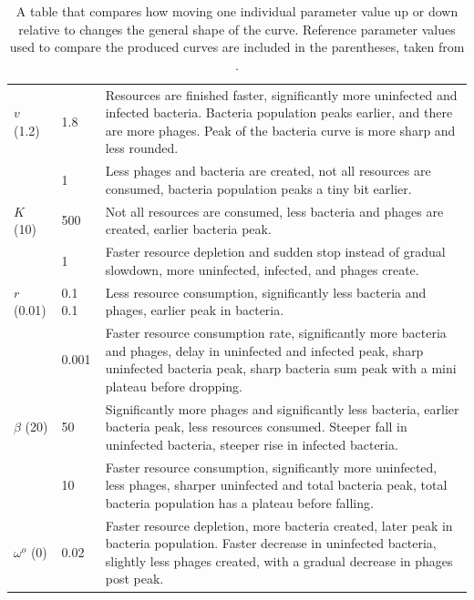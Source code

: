 \begin{table}
\begin{tabularx}{\textwidth}{l l X}
        \midrule
        $v$ (1.2) & 1.8 & Resources are finished faster, significantly more uninfected and infected bacteria. Bacteria population peaks earlier, and there are more phages. Peak of the bacteria curve is more sharp and less rounded. \\
         & 1 & Less phages and bacteria are created, not all resources are consumed, bacteria population peaks a tiny bit earlier.\\

        \midrule
        $K$ (10) & 500 & Not all resources are consumed, less bacteria and phages are created, earlier bacteria peak.\\
         & 1 & Faster resource depletion and sudden stop instead of gradual slowdown, more uninfected, infected, and phages create. \\

        \midrule
        $r$ (0.01) & 0.1 0.1& Less resource consumption, significantly less bacteria and phages, earlier peak in bacteria.\\
         & 0.001 & Faster resource consumption rate, significantly more bacteria and phages, delay in uninfected and infected peak, sharp uninfected bacteria peak, sharp bacteria sum peak with a mini plateau before dropping. \\

        \midrule
        $\beta$ (20) & 50 & Significantly more phages and significantly less bacteria, earlier bacteria peak, less resources consumed. Steeper fall in uninfected bacteria, steeper rise in infected bacteria. \\
         & 10 & Faster resource consumption, significantly more uninfected, less phages, sharper uninfected and total bacteria peak, total bacteria population has a plateau before falling. \\

        \midrule
        $\omega^o$ (0) & 0.02 & Faster resource depletion, more bacteria created, later peak in bacteria population. Faster decrease in uninfected bacteria, slightly less phages created, with a gradual decrease in phages post peak. \\

        \bottomrule
    \end{tabularx}
    \caption{
        A table that compares how moving one individual parameter value up or down relative to  changes the general shape of the curve. 
        Reference parameter values used to compare the produced curves are included in the parentheses, taken from . 
    }
    \label{tab:results:graph_behavior}
\end{table}

